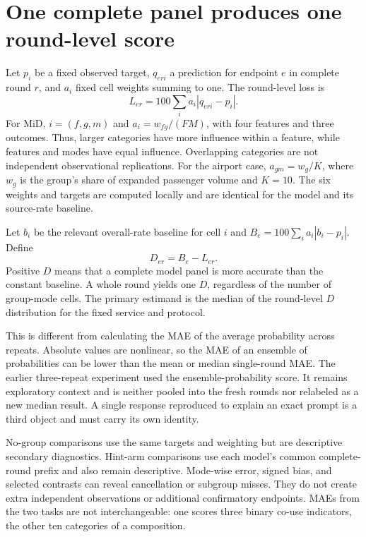 \documentclass{article}
\begin{document}
\section{One complete panel produces one round-level score}
Let $p_i$ be a fixed observed target, $q_{eri}$ a prediction for endpoint $e$ in complete round $r$, and $a_i$ fixed cell weights summing to one. The round-level loss is
\begin{equation}
L_{er}=100\sum_i a_i|q_{eri}-p_i|.
\end{equation}
For MiD, $i=(f,g,m)$ and $a_i=w_{fg}/(FM)$, with four features and three outcomes. Thus, larger categories have more influence within a feature, while features and modes have equal influence. Overlapping categories are not independent observational replications. For the airport case, $a_{gm}=w_g/K$, where $w_g$ is the group's share of expanded passenger volume and $K=10$. The six weights and targets are computed locally and are identical for the model and its source-rate baseline.

Let $b_i$ be the relevant overall-rate baseline for cell $i$ and $B_e=100\sum_i a_i|b_i-p_i|$. Define
\begin{equation}
D_{er}=B_e-L_{er}.
\end{equation}
Positive $D$ means that a complete model panel is more accurate than the constant baseline. A whole round yields one $D$, regardless of the number of group-mode cells. The primary estimand is the median of the round-level $D$ distribution for the fixed service and protocol.

This is different from calculating the MAE of the average probability across repeats. Absolute values are nonlinear, so the MAE of an ensemble of probabilities can be lower than the mean or median single-round MAE. The earlier three-repeat experiment used the ensemble-probability score. It remains exploratory context and is neither pooled into the fresh rounds nor relabeled as a new median result. A single response reproduced to explain an exact prompt is a third object and must carry its own identity.

No-group comparisons use the same targets and weighting but are descriptive secondary diagnostics. Hint-arm comparisons use each model's common complete-round prefix and also remain descriptive. Mode-wise error, signed bias, and selected contrasts can reveal cancellation or subgroup misses. They do not create extra independent observations or additional confirmatory endpoints. MAEs from the two tasks are not interchangeable: one scores three binary co-use indicators, the other ten categories of a composition.
\end{document}

